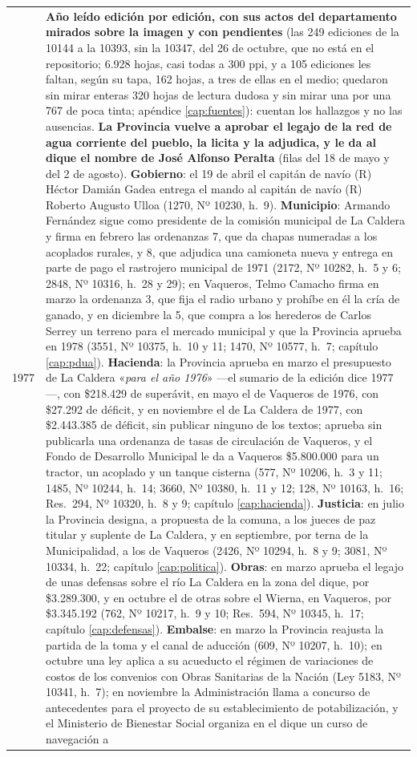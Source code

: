\begin{longtable}{@{}p{2.7cm}p{10.3cm}@{}}
1977 & \textbf{Año leído edición por edición, con sus actos del departamento mirados sobre la imagen y con pendientes} (las 249 ediciones de la 10144 a la 10393, sin la 10347, del 26 de octubre, que no está en el repositorio; 6.928 hojas, casi todas a 300 ppi, y a 105 ediciones les faltan, según su tapa, 162 hojas, a tres de ellas en el medio; quedaron sin mirar enteras 320 hojas de lectura dudosa y sin mirar una por una 767 de poca tinta; apéndice \ref{cap:fuentes}): cuentan los hallazgos y no las ausencias. \textbf{La Provincia vuelve a aprobar el legajo de la red de agua corriente del pueblo, la licita y la adjudica, y le da al dique el nombre de José Alfonso Peralta} (filas del 18 de mayo y del 2 de agosto). \textbf{Gobierno}: el 19 de abril el capitán de navío (R) Héctor Damián Gadea entrega el mando al capitán de navío (R) Roberto Augusto Ulloa (1270, Nº 10230, h.\ 9). \textbf{Municipio}: Armando Fernández sigue como presidente de la comisión municipal de La Caldera y firma en febrero las ordenanzas 7, que da chapas numeradas a los acoplados rurales, y 8, que adjudica una camioneta nueva y entrega en parte de pago el rastrojero municipal de 1971 (2172, Nº 10282, h.\ 5 y 6; 2848, Nº 10316, h.\ 28 y 29); en Vaqueros, Telmo Camacho firma en marzo la ordenanza 3, que fija el radio urbano y prohíbe en él la cría de ganado, y en diciembre la 5, que compra a los herederos de Carlos Serrey un terreno para el mercado municipal y que la Provincia aprueba en 1978 (3551, Nº 10375, h.\ 10 y 11; 1470, Nº 10577, h.\ 7; capítulo \ref{cap:pdua}). \textbf{Hacienda}: la Provincia aprueba en marzo el presupuesto de La Caldera «\textit{para el año 1976}» ---el sumario de la edición dice 1977---, con \$218.429 de superávit, en mayo el de Vaqueros de 1976, con \$27.292 de déficit, y en noviembre el de La Caldera de 1977, con \$2.443.385 de déficit, sin publicar ninguno de los textos; aprueba sin publicarla una ordenanza de tasas de circulación de Vaqueros, y el Fondo de Desarrollo Municipal le da a Vaqueros \$5.800.000 para un tractor, un acoplado y un tanque cisterna (577, Nº 10206, h.\ 3 y 11; 1485, Nº 10244, h.\ 14; 3660, Nº 10380, h.\ 11 y 12; 128, Nº 10163, h.\ 16; Res.\ 294, Nº 10320, h.\ 8 y 9; capítulo \ref{cap:hacienda}). \textbf{Justicia}: en julio la Provincia designa, a propuesta de la comuna, a los jueces de paz titular y suplente de La Caldera, y en septiembre, por terna de la Municipalidad, a los de Vaqueros (2426, Nº 10294, h.\ 8 y 9; 3081, Nº 10334, h.\ 22; capítulo \ref{cap:politica}). \textbf{Obras}: en marzo aprueba el legajo de unas defensas sobre el río La Caldera en la zona del dique, por \$3.289.300, y en octubre el de otras sobre el Wierna, en Vaqueros, por \$3.345.192 (762, Nº 10217, h.\ 9 y 10; Res.\ 594, Nº 10345, h.\ 17; capítulo \ref{cap:defensas}). \textbf{Embalse}: en marzo la Provincia reajusta la partida de la toma y el canal de aducción (609, Nº 10207, h.\ 10); en octubre una ley aplica a su acueducto el régimen de variaciones de costos de los convenios con Obras Sanitarias de la Nación (Ley 5183, Nº 10341, h.\ 7); en noviembre la Administración llama a concurso de antecedentes para el proyecto de su establecimiento de potabilización, y el Ministerio de Bienestar Social organiza en el dique un curso de navegación a 
\end{longtable}
